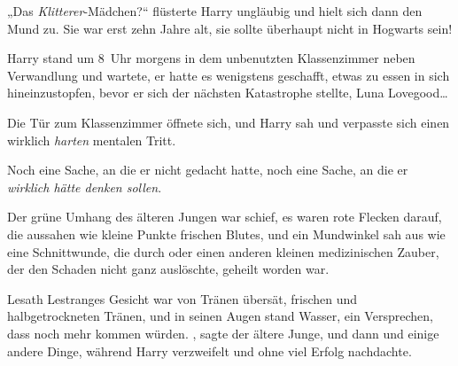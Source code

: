 „Das \emph{Klitterer}-Mädchen?“ flüsterte Harry ungläubig und hielt sich dann den Mund zu. Sie war erst zehn Jahre alt, sie sollte überhaupt nicht in Hogwarts sein!


Harry stand um 8~Uhr morgens in dem unbenutzten Klassenzimmer neben Verwandlung und wartete, er hatte es wenigstens geschafft, etwas zu essen in sich hineinzustopfen, bevor er sich der nächsten Katastrophe stellte, Luna Lovegood…

Die Tür zum Klassenzimmer öffnete sich, und Harry sah und verpasste sich einen wirklich \emph{harten} mentalen Tritt.

Noch eine Sache, an die er nicht gedacht hatte, noch eine Sache, an die er \emph{wirklich hätte denken sollen}.

Der grüne Umhang des älteren Jungen war schief, es waren rote Flecken darauf, die aussahen wie kleine Punkte frischen Blutes, und ein Mundwinkel sah aus wie eine Schnittwunde, die durch  oder einen anderen kleinen medizinischen Zauber, der den Schaden nicht ganz auslöschte, geheilt worden war.

Lesath Lestranges Gesicht war von Tränen übersät, frischen und halbgetrockneten Tränen, und in seinen Augen stand Wasser, ein Versprechen, dass noch mehr kommen würden. , sagte der ältere Junge, und dann  und einige andere Dinge, während Harry verzweifelt und ohne viel Erfolg nachdachte.

